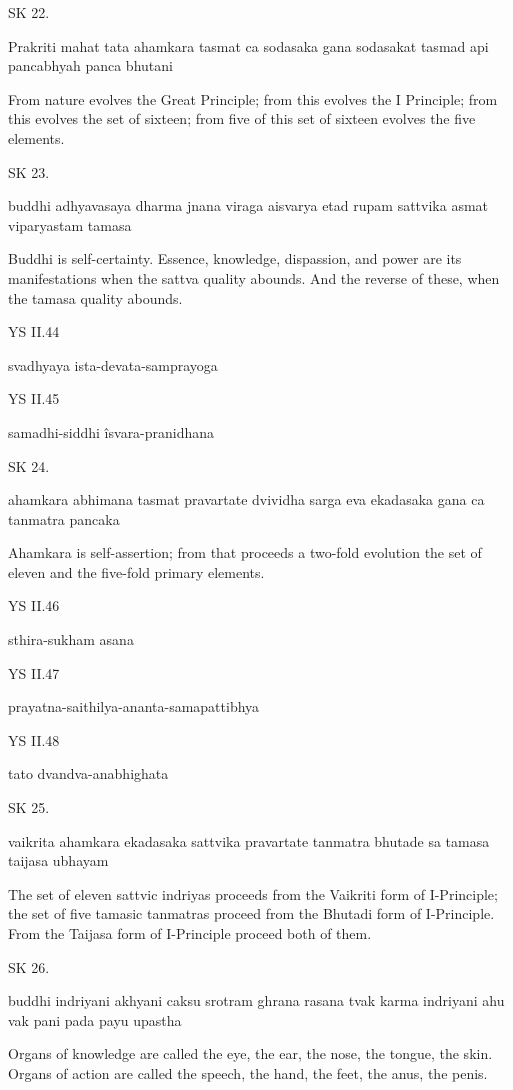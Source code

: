 SK 22.

Prakriti mahat tata ahamkara tasmat ca sodasaka gana
sodasakat tasmad api pancabhyah panca bhutani

From nature evolves the Great Principle;
from this evolves the I Principle;
from this evolves the set of sixteen;
from five of this set of sixteen evolves the five elements.

SK 23.

buddhi adhyavasaya dharma jnana viraga aisvarya
etad rupam sattvika asmat viparyastam tamasa

Buddhi is self-certainty.
Essence, knowledge, dispassion, and power
are its manifestations
when the sattva quality abounds.
And the reverse of these,
when the tamasa quality abounds.

YS II.44

    svadhyaya ista-devata-samprayoga

YS II.45

    samadhi-siddhi îsvara-pranidhana

    SK 24.

ahamkara abhimana tasmat pravartate dvividha sarga eva
ekadasaka gana ca tanmatra pancaka

Ahamkara is self-assertion;
from that proceeds a two-fold evolution
the set of eleven and the five-fold primary elements.

YS II.46

    sthira-sukham asana

YS II.47

    prayatna-saithilya-ananta-samapattibhya

YS II.48

    tato dvandva-anabhighata

SK 25.

vaikrita ahamkara ekadasaka sattvika pravartate
tanmatra bhutade sa tamasa taijasa ubhayam

The set of eleven sattvic indriyas proceeds from
the Vaikriti form of I-Principle;
the set of five tamasic tanmatras proceed from
the Bhutadi form of I-Principle.
From the Taijasa form of I-Principle proceed both of them.

SK 26.

buddhi indriyani akhyani caksu srotram ghrana rasana tvak
karma indriyani ahu vak pani pada payu upastha

Organs of knowledge are called
    the eye, the ear, the nose, the tongue, the skin.
Organs of action are called
    the speech, the hand, the feet, the anus, the penis.


